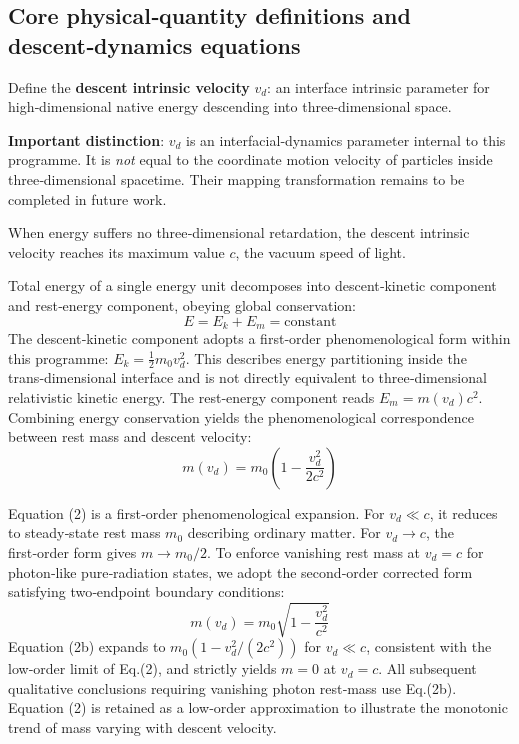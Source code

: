 \documentclass[12pt,a4paper]{article}
\begin{document}
\subsection{Core physical‑quantity definitions and descent‑dynamics equations}
Define the \textbf{descent intrinsic velocity} $v_d$: an interface intrinsic parameter for high‑dimensional native energy descending into three‑dimensional space.

\textbf{Important distinction}: $v_d$ is an interfacial‑dynamics parameter internal to this programme. It is \textit{not} equal to the coordinate motion velocity of particles inside three‑dimensional spacetime. Their mapping transformation remains to be completed in future work.

When energy suffers no three‑dimensional retardation, the descent intrinsic velocity reaches its maximum value $c$, the vacuum speed of light.

Total energy of a single energy unit decomposes into descent‑kinetic component and rest‑energy component, obeying global conservation:
\begin{equation}
E = E_k + E_m = \text{constant}
\end{equation}
The descent‑kinetic component adopts a first‑order phenomenological form within this programme: $E_k=\frac12 m_0 v_d^2$. This describes energy partitioning inside the trans‑dimensional interface and is not directly equivalent to three‑dimensional relativistic kinetic energy. The rest‑energy component reads $E_m = m(v_d) c^2$. Combining energy conservation yields the phenomenological correspondence between rest mass and descent velocity:
\begin{equation}
m(v_d)=m_0\left(1-\frac{v_d^2}{2c^2}\right)
\end{equation}

Equation (2) is a first‑order phenomenological expansion. For $v_d\ll c$, it reduces to steady‑state rest mass $m_0$ describing ordinary matter. For $v_d\to c$, the first‑order form gives $m\to m_0/2$. To enforce vanishing rest mass at $v_d=c$ for photon‑like pure‑radiation states, we adopt the second‑order corrected form satisfying two‑endpoint boundary conditions:
\begin{equation*}
m(v_d)=m_0\sqrt{1-\frac{v_d^2}{c^2}}
\tag{2b}
\end{equation*}
Equation (2b) expands to $m_0\left(1-v_d^2/(2c^2)\right)$ for $v_d\ll c$, consistent with the low‑order limit of Eq.(2), and strictly yields $m=0$ at $v_d=c$. All subsequent qualitative conclusions requiring vanishing photon rest‑mass use Eq.(2b). Equation (2) is retained as a low‑order approximation to illustrate the monotonic trend of mass varying with descent velocity.
\end{document}
